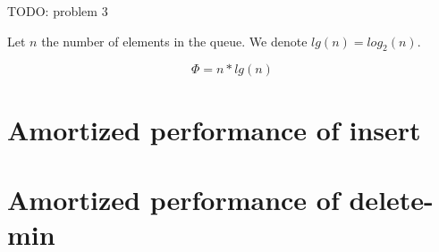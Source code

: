 TODO: problem 3

Let $n$ the number of elements in the queue. We denote $lg(n) = log_2(n)$.

\[
\Phi = n * lg(n)
\]

\section{Amortized performance of insert}
\section{Amortized performance of delete-min}
